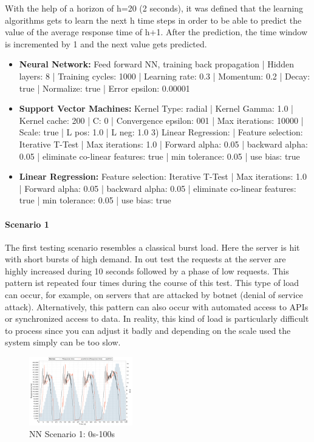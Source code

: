 With the help of a horizon of h=20 (2 seconds), it was defined that the learning algorithms gets to learn the next h time steps in order to be able to predict the value of the average response time of h+1. After the prediction, the time window is incremented by 1 and the next value gets predicted. 

\begin{itemize}
\item \textbf{Neural Network:} Feed forward NN, training back propagation | Hidden layers: 8 | Training cycles: 1000 | Learning rate: 0.3 | Momentum: 0.2 | Decay: true | Normalize: true | Error epsilon: 0.00001
\item \textbf{Support Vector Machines:} Kernel Type: radial | Kernel Gamma: 1.0 | Kernel cache: 200 | C: 0 | Convergence epsilon: 001 | Max iterations: 10000 | Scale: true | L pos: 1.0 | L neg: 1.0 3) Linear Regression: | Feature selection: Iterative T-Test | Max iterations: 1.0 | Forward alpha: 0.05 | backward alpha: 0.05 | eliminate co-linear features: true | min tolerance: 0.05 | use bias: true 
\item \textbf{Linear Regression:} Feature selection: Iterative T-Test | Max iterations: 1.0 | Forward alpha: 0.05 | backward alpha: 0.05 | eliminate co-linear features: true | min tolerance: 0.05 | use bias: true 
\end{itemize}


\paragraph*{Scenario 1}
The first testing scenario resembles a classical burst load. Here the server is hit with short bursts of high demand. In out test the requests at the server are highly increased during 10 seconds followed by a phase of low requests. This pattern ist repeated four times during the course of this test. This type of load can occur, for example, on servers that are attacked by botnet (denial of service attack). Alternatively, this pattern can also occur with automated access to APIs or synchronized access to data. In reality, this kind of load is particularly difficult to process since you can adjust it badly and depending on the scale used the system simply can be too slow.


\begin{figure}[ht]
	\begin{center}
		\includegraphics[width=0.40\textwidth]{chapters/chapter5/fig/NN1_1}
	\end{center}
	\caption{NN Scenario 1: 0s-100s}
	\label{fig:NN1_1}
\end{figure}

